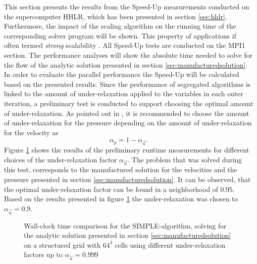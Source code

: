 This section presents the results from the Speed-Up measurements conducted on the supercomputer HHLR, which has been presented in section \ref{sec:hhlr}. Furthermore, the impact of the scaling algorithm on the running time of the corresponding solver program will be shown. This property of applications if often termed \emph{strong} scalability \cite{hager11}. All Speed-Up tests are conducted on the MPI1 section. The performance analyses will show the absolute time needed to solve for the flow of the analytic solution presented in section \ref{sec:manufacturedsolution}. In order to evaluate the parallel performance the Speed-Up will be calculated based on the presented results. Since the performance of segregated algorithms is linked to the amount of under-relaxation applied to the variables in each outer iteration, a preliminary test is conducted to support choosing the optimal amount of under-relaxation. As pointed out in \cite{ferziger02,schaefer99}, it is recommended to choose the amount of under-relaxation for the pressure depending on the amount of under-relaxation for the velocity as
\begin{displaymath}
  \alpha_p = 1 - \alpha_{\vec{u}}.
\end{displaymath}
Figure \ref{fig:underrelax} shows the results of the preliminary runtime measurements for different choices of the under-relaxation factor \( \alpha_{\vec{u}} \). The problem that was solved during this test, corresponds to the manufactured solution for the velocities and the pressure presented in section \ref{sec:manufacturedsolution}. It can be observed, that the optimal under-relaxation factor can be found in a neighborhood of \(0.95\). Based on the results presented in figure \ref{fig:underrelax} the under-relaxation was chosen to \( \alpha_{\vec{u}} =0.9 \). 

\begin{figure}[h!]
  \centering
  \caption{Wall-clock time comparison for the SIMPLE-algorithm, solving for the analytic solution presented in section \ref{sec:manufacturedsolution} on a structured grid with $64^3$ cells using different under-relaxation factors up to $\alpha_\vec{u}=0.999$}
  \label{fig:underrelax}
\end{figure}

